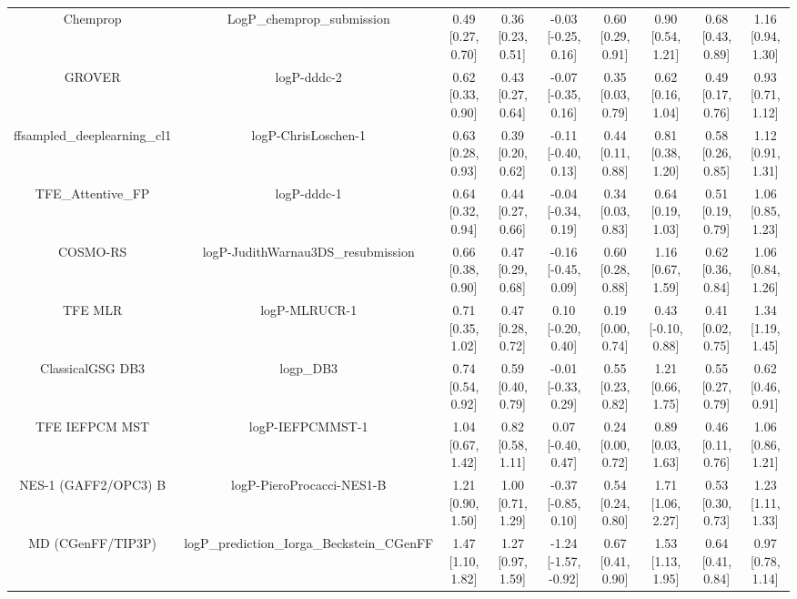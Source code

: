 \documentclass{article}
\begin{document}
\begin{center}
\begin{longtable}{|ccccccccc|}
\bottomrule
\endlastfoot
                  Chemprop &                 LogP\_chemprop\_submission & 0.49 [0.27, 0.70] & 0.36 [0.23, 0.51] &  -0.03 [-0.25, 0.16] & 0.60 [0.29, 0.91] &    0.90 [0.54, 1.21] &    0.68 [0.43, 0.89] &    1.16 [0.94, 1.30] \\
                    GROVER &                                logP-dddc-2 & 0.62 [0.33, 0.90] & 0.43 [0.27, 0.64] &  -0.07 [-0.35, 0.16] & 0.35 [0.03, 0.79] &    0.62 [0.16, 1.04] &    0.49 [0.17, 0.76] &    0.93 [0.71, 1.12] \\
ffsampled_deeplearning_cl1 &                        logP-ChrisLoschen-1 & 0.63 [0.28, 0.93] & 0.39 [0.20, 0.62] &  -0.11 [-0.40, 0.13] & 0.44 [0.11, 0.88] &    0.81 [0.38, 1.20] &    0.58 [0.26, 0.85] &    1.12 [0.91, 1.31] \\
          TFE_Attentive_FP &                                logP-dddc-1 & 0.64 [0.32, 0.94] & 0.44 [0.27, 0.66] &  -0.04 [-0.34, 0.19] & 0.34 [0.03, 0.83] &    0.64 [0.19, 1.03] &    0.51 [0.19, 0.79] &    1.06 [0.85, 1.23] \\
                  COSMO-RS &         logP-JudithWarnau3DS\_resubmission & 0.66 [0.38, 0.90] & 0.47 [0.29, 0.68] &  -0.16 [-0.45, 0.09] & 0.60 [0.28, 0.88] &    1.16 [0.67, 1.59] &    0.62 [0.36, 0.84] &    1.06 [0.84, 1.26] \\
                   TFE MLR &                              logP-MLRUCR-1 & 0.71 [0.35, 1.02] & 0.47 [0.28, 0.72] &   0.10 [-0.20, 0.40] & 0.19 [0.00, 0.74] &   0.43 [-0.10, 0.88] &    0.41 [0.02, 0.75] &    1.34 [1.19, 1.45] \\
          ClassicalGSG DB3 &                                  logp\_DB3 & 0.74 [0.54, 0.92] & 0.59 [0.40, 0.79] &  -0.01 [-0.33, 0.29] & 0.55 [0.23, 0.82] &    1.21 [0.66, 1.75] &    0.55 [0.27, 0.79] &    0.62 [0.46, 0.91] \\
            TFE IEFPCM MST &                           logP-IEFPCMMST-1 & 1.04 [0.67, 1.42] & 0.82 [0.58, 1.11] &   0.07 [-0.40, 0.47] & 0.24 [0.00, 0.72] &    0.89 [0.03, 1.63] &    0.46 [0.11, 0.76] &    1.06 [0.86, 1.21] \\
      NES-1 (GAFF2/OPC3) B &                  logP-PieroProcacci-NES1-B & 1.21 [0.90, 1.50] & 1.00 [0.71, 1.29] &  -0.37 [-0.85, 0.10] & 0.54 [0.24, 0.80] &    1.71 [1.06, 2.27] &    0.53 [0.30, 0.73] &    1.23 [1.11, 1.33] \\
         MD (CGenFF/TIP3P) & logP\_prediction\_Iorga\_Beckstein\_CGenFF & 1.47 [1.10, 1.82] & 1.27 [0.97, 1.59] & -1.24 [-1.57, -0.92] & 0.67 [0.41, 0.90] &    1.53 [1.13, 1.95] &    0.64 [0.41, 0.84] &    0.97 [0.78, 1.14] \\

\end{longtable}
\end{center}
\end{document}
